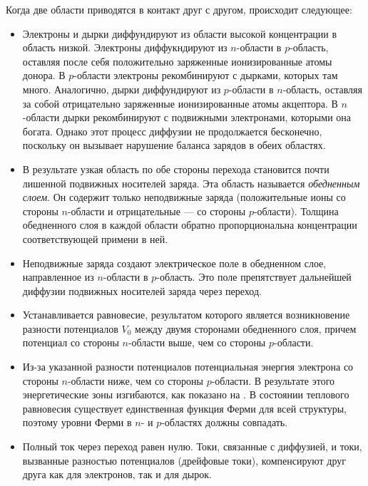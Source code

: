 \documentclass[a4paper, 12pt]{article}
\begin{document}
Когда две области приводятся в контакт друг с другом, происходит
следующее:
\begin{itemize}
    \item Электроны и дырки диффундируют из области высокой
        концентрации в область низкой. Электроны диффукндируют из
        $n$-области в $p$-область, оставляя после себя положительно
        заряженные ионизированные атомы донора. В $p$-области
        электроны рекомбинируют с дырками, которых там много.
        Аналогично, дырки диффундируют из $p$-области в $n$-область,
        оставляя за собой отрицательно заряженные ионизированные атомы
        акцептора. В $n$-области дырки рекомбинируют с подвижными
        электронами, которыми она богата. Однако этот процесс диффузии
        не продолжается бесконечно, поскольку он вызывает нарушение
        баланса зарядов в обеих областях.
    \item В результате узкая область по обе стороны перехода
        становится почти лишенной подвижных носителей заряда. Эта
        область называется \emph{обедненным слоем}. Он содержит только
        неподвижные заряда (положительные ионы со стороны $n$-области
        и отрицательные --- со стороны $p$-области). Толщина
        обедненного слоя в каждой области обратно пропорциональна
        концентрации соответствующей примени в ней.
    \item Неподвижные заряда создают электрическое поле в обедненном
        слое, направленное из $n$-области в $p$-область. Это поле
        препятствует дальнейшей диффузии подвижных носителей заряда
        через переход.
    \item Устанавливается равновесие, результатом которого является
        возникновение разности потенциалов $V_{0}$ между двумя
        сторонами обедненного слоя, причем потенциал со стороны
        $n$-области выше, чем со стороны $p$-области.
    \item Из-за указанной разности потенциалов потенциальная энергия
        электрона со стороны $n$-области ниже, чем со стороны
        $p$-области. В результате этого энергетические зоны
        изгибаются, как показано на . В состоянии теплового
        равновесия существует единственная функция Ферми для всей
        структуры, поэтому уровни Ферми в $n$- и $p$-областях должны
        совпадать.
    \item Полный ток через переход равен нулю. Токи, связанные с
        диффузией, и токи, вызванные разностью потенциалов (дрейфовые
        токи), компенсируют друг друга как для электронов, так и для
        дырок.
\end{itemize}
\end{document}
